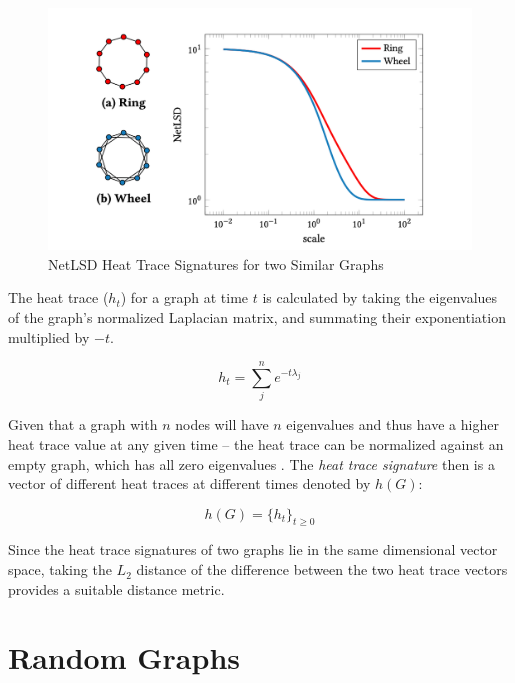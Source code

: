 \begin{singlespacing}
    \begin{figure}[H]
    \centering
    \includegraphics[scale=0.25]{Figures/heat_trace_ex}
    \caption[NetLSD Heat Trace Signatures for two Similar Graphs \cite{netlsd}]{NetLSD Heat Trace Signatures for two Similar Graphs \cite{netlsd}}
    \label{fig:heat_trace_ex}
    \end{figure}
\end{singlespacing}

The heat trace ($h_{t}$) for a graph at time $t$ is calculated by taking the
eigenvalues of the graph's normalized Laplacian matrix, and summating their
exponentiation multiplied by $-t$. 

\begin{equation}\label{equation:heat_trace}
    h_{t}=\sum_{j}^{n}e^{-t\lambda_{j}}
\end{equation}
 
Given that a graph with $n$ nodes will have $n$ eigenvalues and thus have a
higher heat trace value at any given time -- the heat trace can be normalized
against an empty graph, which has all zero eigenvalues \cite{netlsd}. The
\emph{heat trace signature} then is a vector of different heat traces at
different times denoted by $h(G)$:

\begin{equation}\label{equation:heat_trace_sig}
    h(G) = \{h_{t}\}_{t\geq0}
\end{equation}

Since the heat trace signatures of two graphs lie in the same dimensional vector
space, taking the $L_{2}$ distance of the difference between the two heat trace
vectors provides a suitable distance metric.

\section{Random Graphs}\label{sec:RandomGraphs}
    
